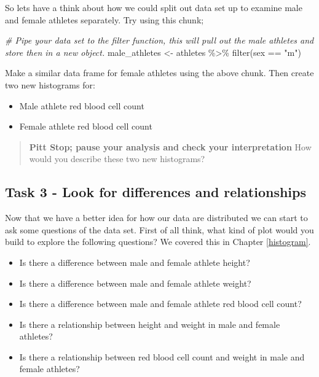 \documentclass[
]{book}
\newenvironment{Shaded}{\begin{snugshade}}{\end{snugshade}}
\newcommand{\CommentTok}[1]{\textcolor[rgb]{0.56,0.35,0.01}{\textit{#1}}}
\newcommand{\FunctionTok}[1]{\textcolor[rgb]{0.00,0.00,0.00}{#1}}
\newcommand{\NormalTok}[1]{#1}
\newcommand{\OtherTok}[1]{\textcolor[rgb]{0.56,0.35,0.01}{#1}}
\newcommand{\SpecialCharTok}[1]{\textcolor[rgb]{0.00,0.00,0.00}{#1}}
\newcommand{\StringTok}[1]{\textcolor[rgb]{0.31,0.60,0.02}{#1}}
\providecommand{\tightlist}{%
  \setlength{\itemsep}{0pt}\setlength{\parskip}{0pt}}
\begin{document}
So lets have a think about how we could split out data set up to examine male and female athletes separately. Try using this chunk;

\begin{Shaded}
\begin{Highlighting}[]
\CommentTok{\# Pipe your data set to the filter function, this will pull out the male athletes and store then in a new object.}
\NormalTok{male\_athletes }\OtherTok{\textless{}{-}}\NormalTok{ athletes }\SpecialCharTok{\%\textgreater{}\%}
  \FunctionTok{filter}\NormalTok{(sex }\SpecialCharTok{==} \StringTok{"m"}\NormalTok{)}
\end{Highlighting}
\end{Shaded}

Make a similar data frame for female athletes using the above chunk. Then create two new histograms for:

\begin{itemize}
\tightlist
\item
  Male athlete red blood cell count
\item
  Female athlete red blood cell count
\end{itemize}

\begin{quote}
\textbf{Pitt Stop; pause your analysis and check your interpretation}
How would you describe these two new histograms?
\end{quote}

\hypertarget{task-3---look-for-differences-and-relationships}{%
\subsection{Task 3 - Look for differences and relationships}\label{task-3---look-for-differences-and-relationships}}

Now that we have a better idea for how our data are distributed we can start to ask some questions of the data set. First of all think, what kind of plot would you build to explore the following questions? We covered this in Chapter \ref{histogram}.

\begin{itemize}
\tightlist
\item
  Is there a difference between male and female athlete height?
\item
  Is there a difference between male and female athlete weight?
\item
  Is there a difference between male and female athlete red blood cell count?
\item
  Is there a relationship between height and weight in male and female athletes?
\item
  Is there a relationship between red blood cell count and weight in male and female athletes?
\end{itemize}
\end{document}
